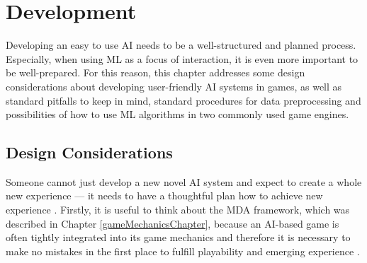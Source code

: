 \documentclass[MGS,Master,english]{twbook}%
\begin{document}
\section{Development} \label{mlDevelopment}
Developing an easy to use \ac{AI} needs to be a well-structured and planned process. Especially, when using \ac{ML} as a focus of interaction, it is even more important to be well-prepared. For this reason, this chapter addresses some design considerations about developing user-friendly \ac{AI} systems in games, as well as standard pitfalls to keep in mind, standard procedures for data preprocessing and possibilities of how to use \ac{ML} algorithms in two commonly used game engines.

\subsection{Design Considerations}
Someone cannot just develop a new novel \ac{AI} system and expect to create a whole new experience — it needs to have a thoughtful plan how to achieve new experience \cite{ai::gameDesign}. Firstly, it is useful to think about the \ac{MDA} framework, which was described in Chapter \ref{gameMechanicsChapter}, because an \ac{AI}-based game is often tightly integrated into its game mechanics and therefore it is necessary to make no mistakes in the first place to fulfill playability and emerging experience \cite{ai::gameDesign}. 
\end{document}
